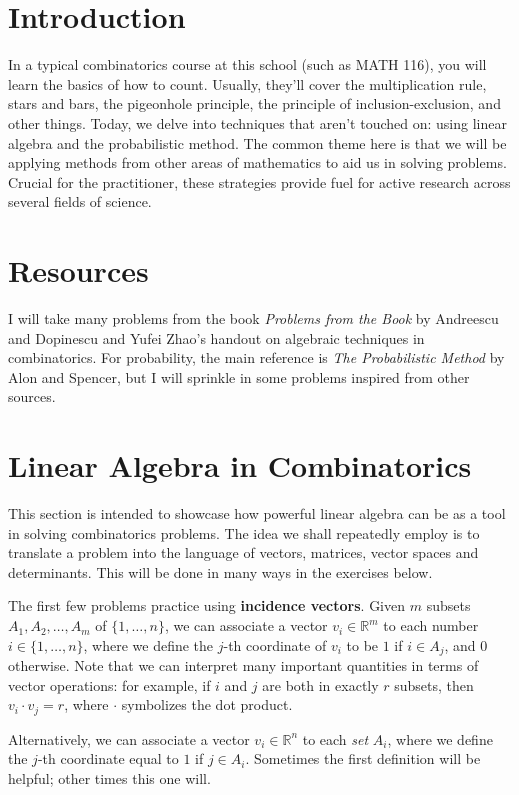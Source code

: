 \documentclass{article}
\theoremstyle{definition}
\theoremstyle{remark}
\newcommand{\RR}{\mathbb{R}}
\begin{document}
\section{Introduction}
In a typical combinatorics course at this school (such as MATH 116), you will learn the basics of how to count. Usually, they'll cover the multiplication rule, stars and bars, the pigeonhole principle, the principle of inclusion-exclusion, and other things. Today, we delve into techniques that aren't touched on: using linear algebra and the probabilistic method. The common theme here is that we will be applying methods from other areas of mathematics to aid us in solving problems. Crucial for the practitioner, these strategies provide fuel for active research across several fields of science.

\section{Resources}
I will take many problems from the book \emph{Problems from the Book} by Andreescu and Dopinescu and Yufei Zhao's handout on algebraic techniques in combinatorics. For probability, the main reference is \emph{The Probabilistic Method} by Alon and Spencer, but I will sprinkle in some problems inspired from other sources.

\section{Linear Algebra in Combinatorics}

This section is intended to showcase how powerful linear algebra can be as a tool in solving combinatorics problems. The idea we shall repeatedly employ is to translate a problem into the language of vectors, matrices, vector spaces and determinants. This will be done in many ways in the exercises below. 

The first few problems practice using \textbf{incidence vectors}. Given $m$ subsets $A_1,A_2,\dots,A_m$ of $\{1,\dots,n\}$, we can associate a vector $v_i\in \RR^m$ to each number $i\in \{1,\dots,n\}$, where we define the $j$-th coordinate of $v_i$ to be $1$ if $i\in A_j$, and $0$ otherwise. Note that we can interpret many important quantities in terms of vector operations: for example, if $i$ and $j$ are both in exactly $r$ subsets, then $v_i\cdot v_j=r$, where $\cdot$ symbolizes the dot product.

Alternatively, we can associate a vector $v_i\in \RR^n$ to each \emph{set} $A_i$, where we define the $j$-th coordinate equal to $1$ if $j\in A_i$. Sometimes the first definition will be helpful; other times this one will.
\end{document}
